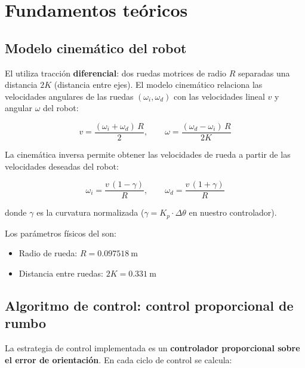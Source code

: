 \documentclass[12pt]{article}
\begin{document}
\section{Fundamentos te\'{o}ricos}

\subsection{Modelo cinem\'{a}tico del robot}
El \pioneer{} utiliza tracci\'{o}n \textbf{diferencial}: dos ruedas motrices de radio $R$ separadas una distancia $2K$ (distancia entre ejes). El modelo cinem\'{a}tico relaciona las velocidades angulares de las ruedas $(\omega_i, \omega_d)$ con las velocidades lineal $v$ y angular $\omega$ del robot:

\begin{equation}
  v = \frac{(\omega_i + \omega_d)\,R}{2}, \qquad
  \omega = \frac{(\omega_d - \omega_i)\,R}{2K}
  \label{eq:cinematica_directa}
\end{equation}

La cinem\'{a}tica inversa permite obtener las velocidades de rueda a partir de las velocidades deseadas del robot:

\begin{equation}
  \omega_i = \frac{v\,(1 - \gamma)}{R}, \qquad
  \omega_d = \frac{v\,(1 + \gamma)}{R}
  \label{eq:cinematica_inversa}
\end{equation}

donde $\gamma$ es la curvatura normalizada ($\gamma = K_p \cdot \Delta\theta$ en nuestro controlador).

Los par\'{a}metros f\'{i}sicos del \pioneer{} son:
\begin{itemize}[leftmargin=2em]
  \item Radio de rueda: $R = \SI{0.097518}{\meter}$
  \item Distancia entre ruedas: $2K = \SI{0.331}{\meter}$
\end{itemize}

\subsection{Algoritmo de control: control proporcional de rumbo}
La estrategia de control implementada es un \textbf{controlador proporcional sobre el error de orientaci\'{o}n}. En cada ciclo de control se calcula:
\end{document}

